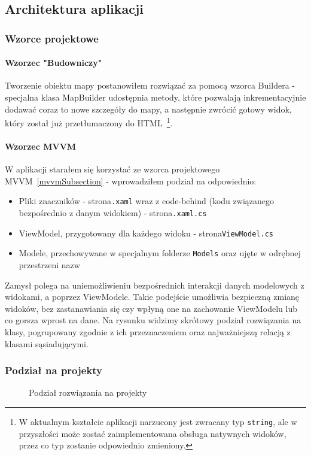 \subsection{Architektura aplikacji}

\subsubsection{Wzorce projektowe}

\paragraph{Wzorzec "Budowniczy"}
Tworzenie obiektu mapy postanowiłem rozwiązać za pomocą wzorca Buildera - 
specjalna klasa MapBuilder udostępnia metody, które pozwalają inkrementacyjnie 
dodawać coraz to nowe szczegóły do mapy, a następnie zwrócić gotowy widok, 
który został już przetłumaczony do HTML~\cprotect\footnote{%
    W aktualnym kształcie aplikacji narzucony jest zwracany typ \verb|string|, 
    ale w przyszłości może zostać zaimplementowana obsługa natywnych widoków,
    przez co typ zostanie odpowiednio zmieniony.}.

\paragraph{Wzorzec MVVM}
W aplikacji starałem się korzystać ze wzorca projektowego MVVM~\ref{mvvmSubsection} - 
wprowadziłem podział na odpowiednio:
\begin{itemize}
    \item Pliki znaczników - strona\verb|.xaml| wraz z code-behind 
    (kodu związanego bezpośrednio z danym widokiem) - strona\verb|.xaml.cs|
    \item ViewModel, przygotowany dla każdego widoku - strona\verb|ViewModel.cs|
    \item Modele, przechowywane w specjalnym folderze \verb|Models| oraz ujęte w odrębnej przestrzeni nazw
\end{itemize}

Zamysł polega na uniemożliwieniu bezpośrednich interakcji danych 
modelowych z widokami, a poprzez ViewModele. Takie podejście umożliwia bezpieczną zmianę 
widoków, bez zastanawiania się czy wpłyną one na zachowanie ViewModelu lub co gorsza wprost na dane.
Na rysunku  widzimy skrótowy podział rozwiązania na klasy, pogrupowany 
zgodnie z ich przeznaczeniem oraz najważniejszą relacją z klasami sąsiadującymi.
\subsubsection{Podział na projekty}
\begin{figure}[!h]
    \centering
    \caption{Podział rozwiązania na projekty}
    \label{img:projectDiagram}
\end{figure}

